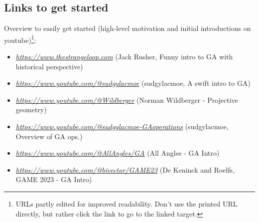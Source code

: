 \subsection{Links to get started}
\label{links}

Overview to easily get started (high-level motivation and initial introductions on
youtube)\footnote{URLs partly edited for improved readability. Don't use the printed URL
directly, but rather click the link to go to the linked target.}:
\begin{itemize}
    \scriptsize
    \item
    \href{https://www.youtube.com/watch?v=1cRFfYQYGxE&list=PLcGKfGEEONaBNsY_bOj8IhbCPvj6OAdWo&index=33}{\textit{https://www.thestrangeloop.com}}
    (Jack Rusher, Funny intro to GA with historical perspective)
    \item
    \href{https://www.youtube.com/watch?v=60z_hpEAtD8&t=17s}{\textit{https://www.youtube.com/@sudgylacmoe}}
    (sudgylacmoe, A swift intro to GA)
    \item
    \href{https://youtu.be/NYK0GBQVngs?is=QgD4LNW-je2KvjcW}{\textit{https://www.youtube.com/@Wildberger}}
    (Norman Wildberger - Projective geometry)
    \item
    \href{https://youtu.be/2AKt6adG_OI?is=D2nWW3uoA8QRGARm}{\textit{https://www.youtube.com/@sudgylacmoe-GAoperations}}
    (sudgylacmoe, Overview of GA ops.)
    \item
    \href{https://www.youtube.com/watch?v=qJHFTMF_pPk&list=PLffJUy1BnWj3deu0cqpk5CiePiwORDiCe}{\textit{https://www.youtube.com/@AllAngles/GA}}
    (All Angles - GA Intro)
    \item
    \href{https://www.youtube.com/watch?v=zgi-13F2Kec&list=PLsSPBzvBkYjxV8QMlOTYgrqa-nmlt_L7A&index=11}{\textit{https://www.youtube.com/@bivector/GAME23}}
    (De Keninck and Roelfs, GAME 2023 - GA Intro)
\end{itemize}

